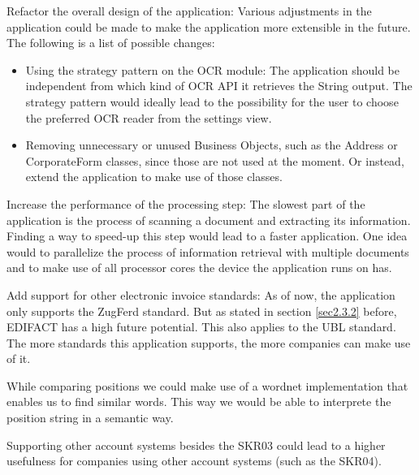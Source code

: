 Refactor the overall design of the application: Various adjustments in the application could be made to make the application more extensible in the future. The following is a list of possible changes:
	\begin{itemize}
		\item Using the strategy pattern on the OCR module: The application should be independent from which kind of OCR API it retrieves the String output. The strategy pattern would ideally lead to the possibility for the user to choose the preferred OCR reader from the settings view.
		\item Removing unnecessary or unused Business Objects, such as the Address or CorporateForm classes, since those are not used at the moment. Or instead, extend the application to make use of those classes.
	\end{itemize}

Increase the performance of the processing step: The slowest part of the application is the process of scanning a document and extracting its information. Finding a way to speed-up this step would lead to a faster application. One idea would to parallelize the process of information retrieval with multiple documents and to make use of all processor cores the device the application runs on has.

Add support for other electronic invoice standards: As of now, the application only supports the ZugFerd standard. But as stated in section \ref{sec2.3.2} before, EDIFACT has a high future potential. This also applies to the UBL standard. The more standards this application supports, the more companies can make use of it.

While comparing positions we could make use of a wordnet implementation that enables us to find similar words. This way we would be able to interprete the position string in a semantic way.

Supporting other account systems besides the SKR03 could lead to a higher usefulness for companies using other account systems (such as the SKR04).

